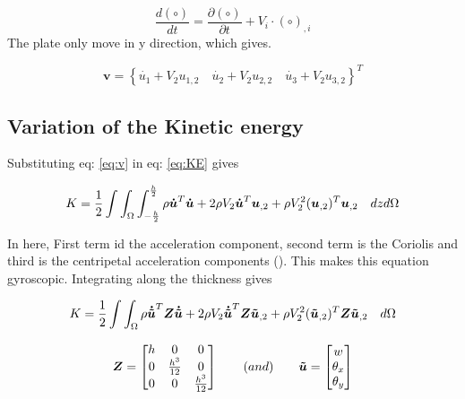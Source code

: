 \documentclass[main.tex]{subfiles}
\begin{document}
\begin{equation}
\frac{d(\circ)}{dt}=\frac{\partial(\circ)}{\partial t} + V_i \cdot (\circ)_{,i} 
\end{equation}
The plate only move in y direction, which gives.

\begin{equation}\label{eq:v}
  \mathbf{v}=\left\{ \dot{u_1}+V_2u_{1,2} \quad  \dot{u_2}+V_2u_{2,2} \quad  \dot{u_3}+V_2u_{3,2} \right\}^T
\end{equation}
\subsection{Variation of the Kinetic energy}

Substituting eq: \ref{eq:v} in eq: \ref{eq:KE} gives

\begin{equation}
K=\frac{1}{2} 
\int \int_\Omega \int_{-\frac{h}{2}}^{\frac{h}{2}} 
\rho \boldsymbol{ \dot{u}} ^T    \boldsymbol{ \dot{u}}
+
2 \rho  V_2 \boldsymbol{ \dot{u}} ^T   \boldsymbol{u}_{,2}
+
\rho  V_2^2  (\boldsymbol{u}_{,2})^T   \boldsymbol{u}_{,2}
\quad
 dz 
 d\Omega
\end{equation}

In here, First term id the acceleration component, second term is the Coriolis and third is the centripetal acceleration components (\cite{JianLi2012}). This makes this equation gyroscopic. Integrating along the thickness gives


\begin{equation}
K=\frac{1}{2} 
\int \int_\Omega
\rho  \boldsymbol{\dot{\tilde{u}}}^T  \boldsymbol{Z}    \boldsymbol{\dot{\tilde{u}}}
+
2 \rho  V_2 \boldsymbol{\dot{\tilde{u}}}^T  \boldsymbol{Z}     \boldsymbol{\tilde{u}}_{,2}
+
\rho  V_2^2 (\boldsymbol{\tilde{u}}_{,2})^T   \boldsymbol{Z}      \boldsymbol{\tilde{u}}_{,2}
\quad
 d\Omega
\end{equation}

\begin{equation}
 \boldsymbol{Z}  = 
 \begin{bmatrix}
h   &  0 & 0 \\
0   &  \frac{h^3}{12}& 0 \\
0   &  0 & \frac{h^3}{12} \\
\end{bmatrix}
\qquad
(and)
\qquad
 \boldsymbol{\tilde{u}}  = 
 \begin{bmatrix}
w   \\
\theta_x    \\
\theta_y   \\
\end{bmatrix}
\end{equation}
\end{document}

